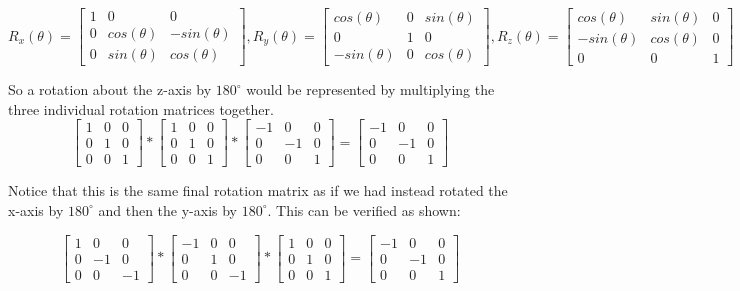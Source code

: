 $$ R_x(\theta) =
\begin{bmatrix}
1	&	0 				& 	0 \\
0 	& 	cos(\theta)	&	-sin(\theta) \\
0 	& 	sin(\theta) 	& 	cos(\theta)
\end{bmatrix},
R_y(\theta) =
\begin{bmatrix}
cos(\theta)		&		0 		& 		sin(\theta) \\
0 				&		1		& 		0 \\
-sin(\theta) 	& 		0 		& 		cos(\theta)

\end{bmatrix},
R_z(\theta) =
\begin{bmatrix}
cos(\theta)		&		sin(\theta) & 		0 \\
-sin(\theta)	&		cos(\theta)	& 		0 \\
0 				& 		0 			& 		1
\end{bmatrix}
$$

So a rotation about the z-axis by $180^\circ$ would be represented by multiplying the three individual rotation matrices together.
\\
$$
\begin{bmatrix}
1	&	0 	& 	0 \\
0 	& 	1	&	0 \\
0 	& 	0 	& 	1
\end{bmatrix}
*
\begin{bmatrix}
1	&	0 	& 	0 \\
0 	& 	1	&	0 \\
0 	& 	0 	& 	1
\end{bmatrix}
*
\begin{bmatrix}
-1	&	0 	& 	0 \\
0 	& 	-1	&	0 \\
0 	& 	0 	& 	1
\end{bmatrix}
=
\begin{bmatrix}
-1	&	0 	& 	0 \\
0 	& 	-1	&	0 \\
0 	& 	0 	& 	1
\end{bmatrix} $$

Notice that this is the same final rotation matrix as if we had instead rotated the x-axis by $180^\circ$ and then the y-axis by $180^\circ$.
This can be verified as shown:

$$
\begin{bmatrix}
1	&	0 	& 	0 \\
0 	& 	-1	&	0 \\
0 	& 	0 	& 	-1
\end{bmatrix}
*
\begin{bmatrix}
-1	&	0 	& 	0 \\
0 	& 	1	&	0 \\
0 	& 	0 	& 	-1
\end{bmatrix}
*
\begin{bmatrix}
1	&	0 	& 	0 \\
0 	& 	1	&	0 \\
0 	& 	0 	& 	1
\end{bmatrix}
=
\begin{bmatrix}
-1	&	0 	& 	0 \\
0 	& 	-1	&	0 \\
0 	& 	0 	& 	1
\end{bmatrix} $$

